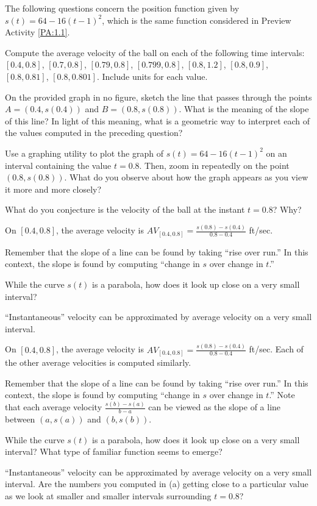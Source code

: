 \begin{activity} \label{A:1.1.1}  The following questions concern the position function given by $s(t) = 64 - 16(t-1)^2$, which is the same function considered in Preview Activity \ref{PA:1.1}.
\ba
	\item Compute the average velocity of the ball on each of the following time intervals: $[0.4,0.8]$, $[0.7,0.8]$, $[0.79, 0.8]$, $[0.799,0.8]$, $[0.8,1.2]$, $[0.8,0.9]$, $[0.8,0.81]$, $[0.8,0.801]$.  Include units for each value.
	\item On the provided graph in no figure, sketch the line that passes through the points $A=(0.4, s(0.4))$ and $B=(0.8, s(0.8))$.  What is the meaning of the slope of this line?  In light of this meaning, what is a geometric way to interpret each of the values computed in the preceding question?
	\item Use a graphing utility to plot the graph of $s(t) = 64 - 16(t-1)^2$ on an interval containing the value $t = 0.8$.  Then, zoom in repeatedly on the point $(0.8, s(0.8))$.  What do you observe about how the graph appears as you view it more and more closely?  
	\item What do you conjecture is the velocity of the ball at the instant $t = 0.8$?  Why?
\ea

\end{activity}
\begin{smallhint}
\ba
	\item On $[0.4,0.8]$, the average velocity is $AV_{[0.4,0.8]} = \frac{s(0.8)-s(0.4)}{0.8-0.4}$ ft/sec.
	\item Remember that the slope of a line can be found by taking ``rise over run.''  In this context, the slope is found by computing ``change in $s$ over change in $t$.''
	\item While the curve $s(t)$ is a parabola, how does it look up close on a very small interval? 
	\item ``Instantaneous'' velocity can be approximated by average velocity on a very small interval.
\ea
\end{smallhint}
\begin{bighint}
\ba
	\item On $[0.4,0.8]$, the average velocity is $AV_{[0.4,0.8]} = \frac{s(0.8)-s(0.4)}{0.8-0.4}$ ft/sec.  Each of the other average velocities is computed similarly.
	\item Remember that the slope of a line can be found by taking ``rise over run.''  In this context, the slope is found by computing ``change in $s$ over change in $t$.''  Note that each average velocity $\frac{s(b)-s(a)}{b-a}$ can be viewed as the slope of a line between $(a,s(a))$ and $(b,s(b))$.
	\item While the curve $s(t)$ is a parabola, how does it look up close on a very small interval?  What type of familiar function seems to emerge?
	\item ``Instantaneous'' velocity can be approximated by average velocity on a very small interval.  Are the numbers you computed in (a) getting close to a particular value as we look at smaller and smaller intervals surrounding $t = 0.8$?
\ea
\end{bighint}
